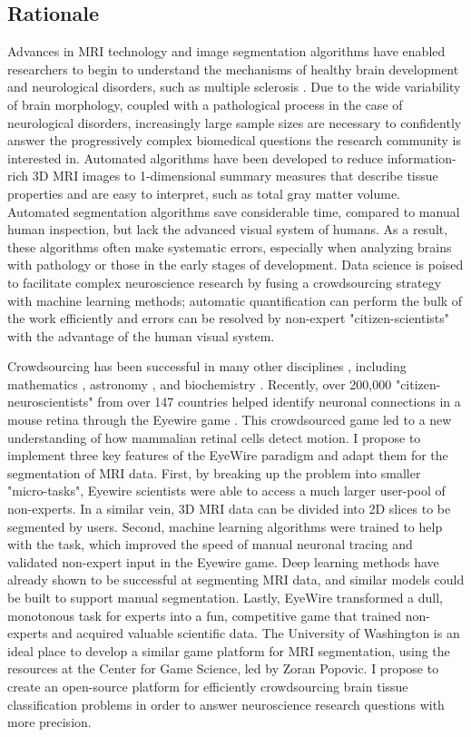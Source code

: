 \subsection*{Rationale}

Advances in MRI technology and image segmentation algorithms have enabled researchers to begin to understand the mechanisms of healthy brain development \cite{giedd1999brain} and neurological disorders, such as multiple sclerosis \cite{bakshi2008mri}. Due to the wide variability of brain morphology, coupled with a pathological process in the case of neurological disorders, increasingly large sample sizes are necessary to confidently answer the progressively complex biomedical questions the research community is interested in. Automated algorithms have been developed to reduce information-rich 3D MRI images to 1-dimensional summary measures that describe tissue properties and are easy to interpret, such as total gray matter volume. Automated  segmentation algorithms save considerable time, compared to manual human inspection, but lack the advanced visual system of humans. As a result, these algorithms often make systematic errors, especially when analyzing brains with pathology or those in the early stages of development. Data science is poised to facilitate complex neuroscience research by fusing a crowdsourcing strategy with machine learning methods; automatic quantification can perform the bulk of the work efficiently and errors can be resolved by non-expert "citizen-scientists" with the advantage of the human visual system.

Crowdsourcing has been successful in many other disciplines \cite{wiggins2011conservation}, including mathematics \cite{cranshaw2011polymath}, astronomy \cite{lintott2008galaxy}, and biochemistry \cite{eiben2012increased} . Recently, over 200,000 "citizen-neuroscientists"  from over 147 countries helped identify neuronal connections in a mouse retina through the Eyewire game \cite{kim2014space}. This crowdsourced game led to a new understanding of how mammalian retinal cells detect motion. I propose to implement three key features of the EyeWire paradigm and adapt them for the segmentation of MRI data. First, by breaking up the problem into smaller "micro-tasks", Eyewire scientists were able to access a much larger user-pool of non-experts. In a similar vein, 3D MRI data can be divided into 2D slices to be segmented by users. Second, machine learning algorithms were trained to help with the task, which improved the speed of manual neuronal tracing and validated non-expert input in the Eyewire game. Deep learning methods have already shown to be successful at segmenting MRI data, and similar models could be built to support manual segmentation. Lastly, EyeWire transformed a dull, monotonous task for experts into a fun, competitive game that trained non-experts and acquired valuable scientific data. The University of Washington is an ideal place to develop a similar game platform for MRI segmentation, using the resources at the Center for Game Science, led by Zoran Popovic. I propose to create an open-source platform for efficiently crowdsourcing brain tissue classification problems in order to answer neuroscience research questions with more precision.

